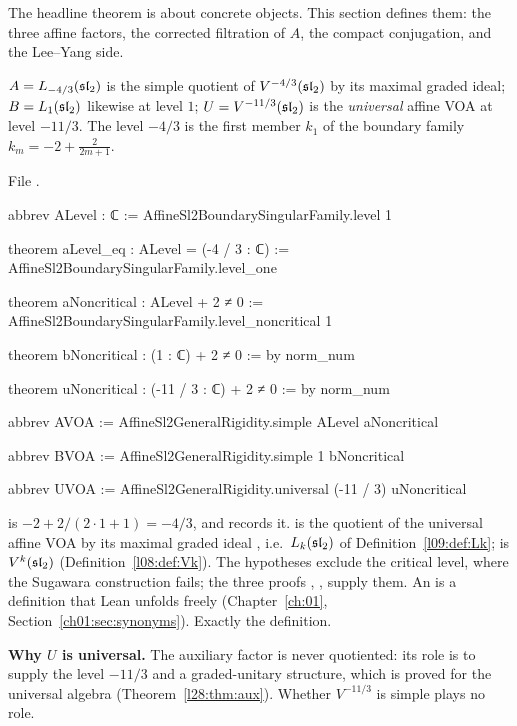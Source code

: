 The headline theorem is about concrete objects. This section defines them: the three affine factors, the corrected
filtration of $A$, the compact conjugation, and the Lee--Yang side.

\begin{definition}\label{l28:def:factors}
$A=L_{-4/3}(\mathfrak{sl}_2)$ is the simple quotient of $V^{-4/3}(\mathfrak{sl}_2)$ by its maximal graded ideal;
$B=L_1(\mathfrak{sl}_2)$ likewise at level $1$; $U=V^{-11/3}(\mathfrak{sl}_2)$ is the \emph{universal} affine VOA at level
$-11/3$. The level $-4/3$ is the first member $k_1$ of the boundary family $k_m=-2+\frac{2}{2m+1}$.
\end{definition}

\noindent File .
\begin{leancode}
abbrev ALevel : ℂ := AffineSl2BoundarySingularFamily.level 1

theorem aLevel_eq : ALevel = (-4 / 3 : ℂ) :=
  AffineSl2BoundarySingularFamily.level_one

theorem aNoncritical : ALevel + 2 ≠ 0 :=
  AffineSl2BoundarySingularFamily.level_noncritical 1

theorem bNoncritical : (1 : ℂ) + 2 ≠ 0 := by norm_num

theorem uNoncritical : (-11 / 3 : ℂ) + 2 ≠ 0 := by norm_num

abbrev AVOA := AffineSl2GeneralRigidity.simple ALevel aNoncritical

abbrev BVOA := AffineSl2GeneralRigidity.simple 1 bNoncritical

abbrev UVOA := AffineSl2GeneralRigidity.universal (-11 / 3) uNoncritical
\end{leancode}

\begin{dictionary}
 is $-2+2/(2\cdot1+1)=-4/3$, and  records it.
 is the quotient of the universal affine VOA by its maximal graded ideal
, i.e.\ $L_k(\mathfrak{sl}_2)$ of Definition~\ref{l09:def:Lk};  is
$V^k(\mathfrak{sl}_2)$ (Definition~\ref{l08:def:Vk}). The hypotheses  exclude the critical level,
where the Sugawara construction fails; the three proofs , ,  supply
them. An  is a definition that Lean unfolds freely (Chapter~\ref{ch:01}, Section~\ref{ch01:sec:synonyms}).
Exactly the definition.

\textbf{Why $U$ is universal.} The auxiliary factor is never quotiented: its role is to supply the level $-11/3$ and a
graded-unitary structure, which is proved for the universal algebra (Theorem~\ref{l28:thm:aux}). Whether $V^{-11/3}$ is
simple plays no role.
\end{dictionary}

